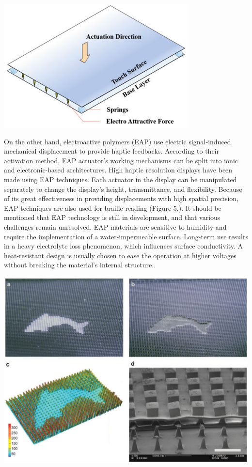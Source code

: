 \documentclass[12pt, a4paper]{article}
\begin{document}
\begin{multicols}{2}
\captionsetup{type=figure}
\includegraphics[width=.49\textwidth]{Surface.png}
\vspace*{3mm}

\par On the other hand, electroactive polymers (EAP) use electric signal-induced mechanical displacement to provide haptic feedbacks. According to their activation method, EAP actuator's working mechanisms can be split into ionic and electronic-based architectures. High haptic resolution displays have been made using EAP techniques. Each actuator in the display can be manipulated separately to change the display's height, transmittance, and flexibility. Because of its great effectiveness in providing displacements with high spatial precision, EAP techniques are also used for braille reading (Figure 5.). It should be mentioned that EAP technology is still in development, and that various challenges remain unresolved. EAP materials are sensitive to humidity and require the implementation of a water-impermeable surface. Long-term use results in a heavy electrolyte loss phenomenon, which influences surface conductivity. A heat-resistant design is usually chosen to ease the operation at higher voltages without breaking the material's internal structure.\cite{TBHMI}.

\captionsetup{type=figure}
\includegraphics[width=.49\textwidth]{EAP.png}
\vspace*{3mm}


\end{multicols}
\end{document}
